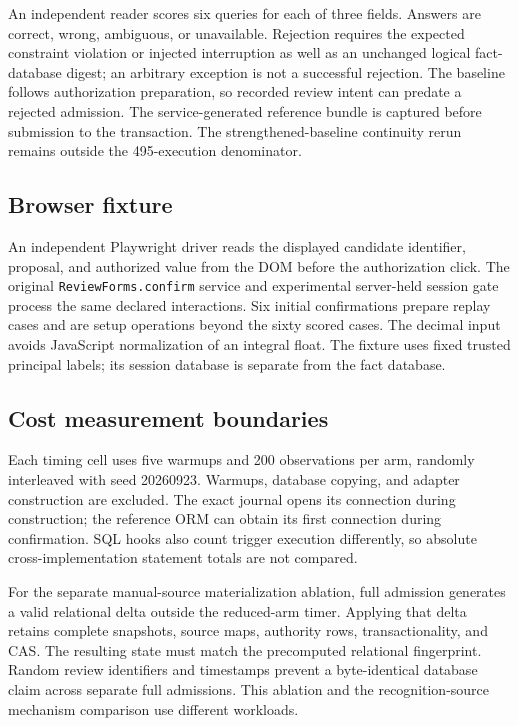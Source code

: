 \documentclass[11pt,a4paper]{article}
\newcommand{\code}[1]{\nolinkurl{#1}}
\begin{document}
An independent reader scores six queries for each of three fields. Answers are correct, wrong, ambiguous, or unavailable. Rejection requires the expected constraint violation or injected interruption as well as an unchanged logical fact-database digest; an arbitrary exception is not a successful rejection. The baseline follows authorization preparation, so recorded review intent can predate a rejected admission. The service-generated reference bundle is captured before submission to the transaction. The strengthened-baseline continuity rerun remains outside the 495-execution denominator.

\subsection{Browser fixture}

An independent Playwright driver reads the displayed candidate identifier, proposal, and authorized value from the DOM before the authorization click. The original \code{ReviewForms.confirm} service and experimental server-held session gate process the same declared interactions. Six initial confirmations prepare replay cases and are setup operations beyond the sixty scored cases. The decimal input avoids JavaScript normalization of an integral float. The fixture uses fixed trusted principal labels; its session database is separate from the fact database.

\subsection{Cost measurement boundaries}

Each timing cell uses five warmups and 200 observations per arm, randomly interleaved with seed 20260923. Warmups, database copying, and adapter construction are excluded. The exact journal opens its connection during construction; the reference ORM can obtain its first connection during confirmation. SQL hooks also count trigger execution differently, so absolute cross-implementation statement totals are not compared.

For the separate manual-source materialization ablation, full admission generates a valid relational delta outside the reduced-arm timer. Applying that delta retains complete snapshots, source maps, authority rows, transactionality, and CAS. The resulting state must match the precomputed relational fingerprint. Random review identifiers and timestamps prevent a byte-identical database claim across separate full admissions. This ablation and the recognition-source mechanism comparison use different workloads.
\end{document}
